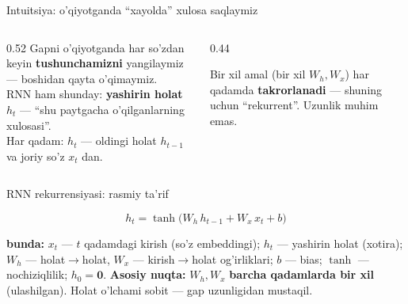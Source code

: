 \documentclass[aspectratio=169,11pt]{beamer}
\newcommand{\bunda}[1]{{\small\textbf{bunda:}\; #1}}
\begin{document}
\begin{frame}{Intuitsiya: o'qiyotganda ``xayolda'' xulosa saqlaymiz}
  \begin{columns}[T]
    \begin{column}{0.52\textwidth}
      \small
      Gapni o'qiyotganda har so'zdan keyin \textbf{tushunchamizni} yangilaymiz ---
      boshidan qayta o'qimaymiz.\\[6pt]
      RNN ham shunday: \textbf{yashirin holat} $h_t$ --- ``shu paytgacha
      o'qilganlarning xulosasi''.\\[4pt]
      Har qadam: $h_t$ --- oldingi holat $h_{t-1}$ va joriy so'z $x_t$ dan.
    \end{column}
    \begin{column}{0.44\textwidth}
      \begin{tcolorbox}[okbox,top=2pt,bottom=2pt]
        \footnotesize
        Bir xil amal (bir xil $W_h, W_x$) har qadamda \textbf{takrorlanadi} ---
        shuning uchun ``rekurrent''. Uzunlik muhim emas.
      \end{tcolorbox}
    \end{column}
  \end{columns}
\end{frame}

\begin{frame}{RNN rekurrensiyasi: rasmiy ta'rif}
  \begin{tcolorbox}[defbox,title=Ta'rif: RNN yashirin holati]
    \vspace{-0.4em}
    $$ h_t = \tanh\!\big(W_h\,h_{t-1} + W_x\,x_t + b\big) $$
  \end{tcolorbox}
  \vspace{3pt}
  \bunda{$x_t$ --- $t$ qadamdagi kirish (so'z embeddingi); $h_t$ --- yashirin holat
  (xotira); $W_h$ --- holat$\to$holat, $W_x$ --- kirish$\to$holat og'irliklari;
  $b$ --- bias; $\tanh$ --- nochiziqlilik; $h_0=\mathbf{0}$.}
  \vspace{4pt}
  \textbf{Asosiy nuqta:} $W_h, W_x$ \textbf{barcha qadamlarda bir xil} (ulashilgan).
  Holat o'lchami sobit --- gap uzunligidan mustaqil.
\end{frame}
\end{document}
